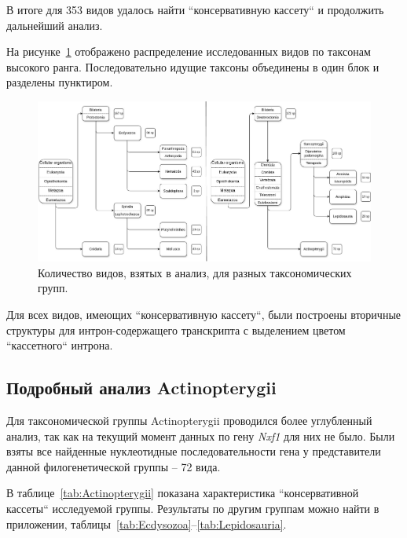 В итоге для 353 видов удалось найти ``консервативную кассету`` и продолжить дальнейший анализ.


На рисунке~\ref{fig:tree_summary} отображено распределение исследованных видов по таксонам высокого ранга.
Последовательно идущие таксоны объединены в один блок и разделены пунктиром.

\begin{figure}[h] %
    \centering
    \includegraphics[width=1.0\textwidth]{images/Tree_summary}
    \caption{Количество видов, взятых в анализ, для разных таксономических групп.}
    \label{fig:tree_summary}
\end{figure}

Для всех видов, имеющих ``консервативную кассету``, были построены вторичные структуры для интрон-содержащего транскрипта с выделением цветом ``кассетного`` интрона.


\subsection{Подробный анализ Actinopterygii}

Для таксономической группы Actinopterygii проводился более углубленный анализ, так как на текущий момент данных по гену \textit{Nxf1} для них не было.
Были взяты все найденные нуклеотидные последовательности гена у представители данной филогенетической группы – 72 вида.


В таблице~\ref{tab:Actinopterygii} показана характеристика ``консервативной кассеты`` исследуемой группы.
Результаты по другим группам можно найти в приложении, таблицы~\ref{tab:Ecdysozoa}--\ref{tab:Lepidosauria}.


